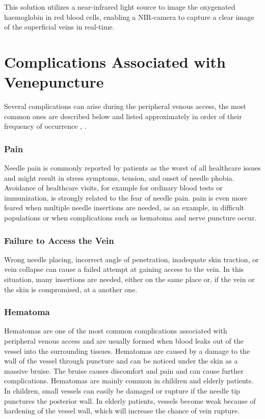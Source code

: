 This solution utilizes a near-infrared light source to image the oxygenated haemoglobin in red blood cells, enabling a NIR-camera to capture a clear image of the superficial veins in real-time. 

\section{Complications Associated with Venepuncture}

Several complications can arise during the peripheral venous access, the most common ones are described below and listed approximately in order of their frequency of occurrence \parencite{comlicationsVeni}, \parencite{roboVenipuncture}.

\subsubsection{Pain}
Needle pain is commonly reported by patients as the worst of all healthcare issues and might result in stress symptoms, tension, and onset of needle phobia. Avoidance of healthcare visits, for example for ordinary blood tests or immunization, is strongly related to the fear of needle pain. pain is even more feared when multiple needle insertions are needed, as an example, in difficult populations or when complications such as hematoma and nerve puncture occur.

\subsubsection{Failure to Access the Vein}
Wrong needle placing, incorrect angle of penetration, inadequate skin traction, or vein collapse can cause a failed attempt at gaining access to the vein. In this situation, many insertions are needed, either on the same place or, if the vein or the skin is compromised, at a another one.

\subsubsection{Hematoma}
Hematomas are one of the most common complications associated with peripheral venous access and are usually formed when blood leaks out of the vessel into the surrounding tissues. Hematomas are caused by a damage to the wall of the vessel through puncture and can be noticed under the skin as a massive bruise. The bruise causes discomfort and pain and can cause further complications. Hematomas are mainly common in children and elderly patients. In children, small vessels can easily be damaged or rupture if the needle tip punctures the posterior wall.
In elderly patients, vessels become weak because of hardening of the vessel wall, which will increase the chance of vein rupture. 

